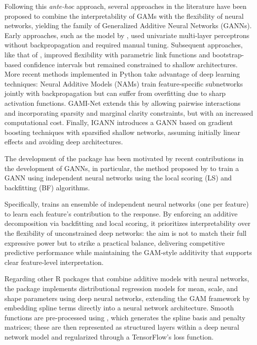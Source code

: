 Following this \emph{ante-hoc} approach, several approaches in the literature have been proposed to combine the interpretability of GAMs with the flexibility of neural networks, yielding the family of Generalized Additive Neural Networks (GANNs). Early approaches, such as the model by \citet{GNAM}, used univariate multi-layer perceptrons without backpropagation and required manual tuning. Subsequent approaches, like that of \citet{Bras-Geraldes2019}, improved flexibility with parametric link functions and bootstrap-based confidence intervals but remained constrained to shallow architectures. More recent methods implemented in Python take advantage of deep learning techniques: Neural Additive Models (NAMs) \citep{NEURIPS2021_251bd044} train feature-specific subnetworks jointly with backpropagation but can suffer from overfitting due to sharp activation functions. GAMI-Net \citep{yang2021gami} extends this by allowing pairwise interactions and incorporating sparsity and marginal clarity constraints, but with an increased computational cost. Finally, IGANN \citep{kraus2023interpretable} introduces a GANN based on gradient boosting techniques with sparsified shallow networks, assuming initially linear effects and avoiding deep architectures.

The development of the  package has been motivated by recent contributions in the development of GANNs, in particular, the method proposed by \citet{neuralGAM} to train a GANN using independent neural networks using the local scoring (LS) and backfitting (BF) algorithms. 

Specifically,  trains an ensemble of independent neural networks (one per feature) to learn each feature’s contribution to the response. By enforcing an additive decomposition via backfitting and local scoring, it prioritizes interpretability over the flexibility of unconstrained deep networks: the aim is not to match their full expressive power but to strike a practical balance, delivering competitive predictive performance while maintaining the GAM-style additivity that supports clear feature-level interpretation.

Regarding other R packages that combine additive models with neural networks, the  package \citep{deepregression} implements distributional regression models for mean, scale, and shape parameters using deep neural networks, extending the GAM framework by embedding spline terms directly into a neural network architecture. Smooth functions are pre-processed using  \citep{mgcv}, which generates the spline basis and penalty matrices; these are then represented as structured layers within a deep neural network model and regularized through a TensorFlow’s loss function. 

